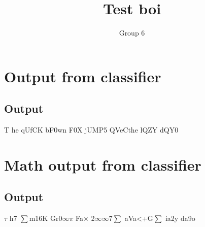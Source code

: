 \documentclass[11pt]{article}
\title{Test boi}
\author{Group 6}
\begin{document}
\maketitle
\tableofcontents\newpage\newpage
\section{Output from classifier}
\label{section1}
\subsection{Output}
\label{Sec1_L2_Introduction}
T he qUfCK bF0wn F0X jUMP5 \newline QVeCthe lQZY dQY0%
\section{Math output from classifier}
\label{section1}
\subsection{Output}
\label{Sec1_L2_Introduction}
$\tau$ h7 $\sum$m16K Gr0$\infty$$\pi$ Fa$\times$ 2$\infty$$\infty$7$\sum$ \newline aVa<+G$\sum$ ia2y da9o
\end{document}
